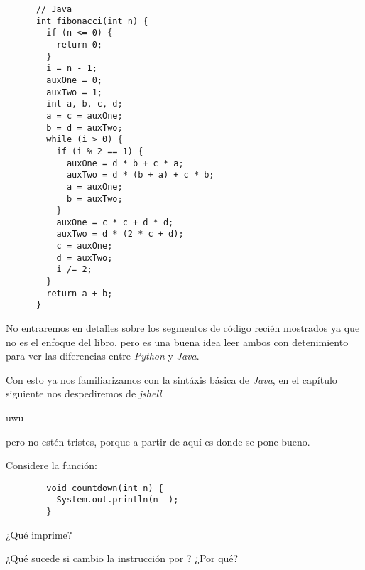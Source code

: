     \begin{verbatim}
      // Java
      int fibonacci(int n) {
        if (n <= 0) {
          return 0;
        }
        i = n - 1;
        auxOne = 0;
        auxTwo = 1;
        int a, b, c, d;
        a = c = auxOne;
        b = d = auxTwo;
        while (i > 0) {
          if (i % 2 == 1) {
            auxOne = d * b + c * a;
            auxTwo = d * (b + a) + c * b;
            a = auxOne;
            b = auxTwo;
          }
          auxOne = c * c + d * d;
          auxTwo = d * (2 * c + d);
          c = auxOne;
          d = auxTwo;
          i /= 2;
        }
        return a + b;
      }
    \end{verbatim}
    
    No entraremos en detalles sobre los segmentos de código recién mostrados ya que no es el enfoque
    del libro, pero es una buena idea leer ambos con detenimiento para ver las diferencias entre
    \textit{Python} y \textit{Java}.

    Con esto ya nos familiarizamos con la sintáxis básica de \textit{Java}, en el capítulo siguiente
    nos despediremos de \textit{jshell}
    \begin{center}
      uwu
    \end{center}
    pero no estén tristes, porque a partir de aquí es donde se pone bueno.

    \begin{exercise}
      Considere la función:
      \begin{verbatim}
        void countdown(int n) {
          System.out.println(n--);
        }
      \end{verbatim}
      ¿Qué imprime?

      ¿Qué sucede si cambio la instrucción  por ?
      ¿Por qué?
    \end{exercise}